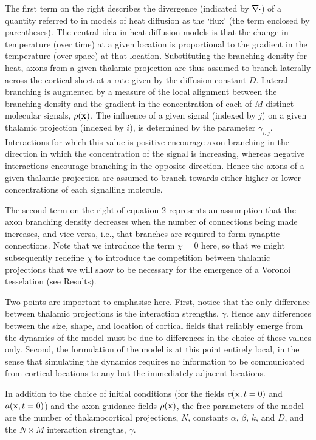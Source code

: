 \documentclass[9pt,twocolumn,twoside,lineno]{pnas-new}
\begin{document}
The first term on the right describes the divergence (indicated by
$\nabla\vcdot$) of a quantity referred to in models of heat diffusion as the
`flux' (the term enclosed by parentheses). The central idea in heat diffusion
models is that the change in temperature (over time) at a given location is
proportional to the gradient in the temperature (over space) at that
location. Substituting the branching density for heat, axons from a given
thalamic projection are thus assumed to branch laterally across the cortical
sheet at a rate given by the diffusion constant $D$. Lateral branching is
augmented by a measure of the local alignment between the branching density
and the gradient in the concentration of each of $M$ distinct molecular
signals, $\rho(\mathbf{x})$. The influence of a given signal (indexed by $j$) on a
given thalamic projection (indexed by $i$), is determined by the parameter
$\gamma_{i,j}$. Interactions for which this value is positive encourage axon
branching in the direction in which the concentration of the signal is
increasing, whereas negative interactions encourage branching in the opposite
direction. Hence the axons of a given thalamic projection are assumed to
branch towards either higher or lower concentrations of each signalling
molecule.

The second term on the right of equation 2 represents an assumption that the
axon branching density decreases when the number of connections being made
increases, and vice versa, i.e., that branches are required to form synaptic
connections. Note that we introduce the term $\chi=0$ here, so that we might
subsequently redefine $\chi$ to introduce the competition between thalamic
projections that we will show to be necessary for the emergence of a Voronoi
tesselation (see Results).

Two points are important to emphasise here. First, notice that the only
difference between thalamic projections is the interaction strengths,
$\gamma$. Hence any differences between the size, shape, and location of
cortical fields that reliably emerge from the dynamics of the model must be
due to differences in the choice of these values only. Second, the formulation
of the model is at this point entirely local, in the sense that simulating the
dynamics requires no information to be communicated from cortical locations to
any but the immediately adjacent locations.

In addition to the choice of initial conditions (for the fields
$c(\mathbf{x},t=0)$ and $a(\mathbf{x},t=0)$) and the axon guidance fields
$\rho(\mathbf{x})$, the free parameters of the model are the number of
thalamocortical projections, $N$, constants $\alpha$, $\beta$, $k$, and $D$,
and the $N\times M$ interaction strengths, $\gamma$.
\end{document}

